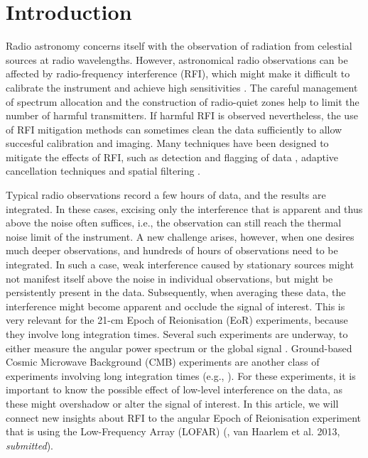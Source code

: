 \documentclass[useAMS,usenatbib]{mn2e}
\begin{document}
\section{Introduction}
Radio astronomy concerns itself with the observation of radiation from celestial sources at radio wavelengths. However, astronomical radio observations can be affected by radio-frequency interference (RFI), which might make it difficult to calibrate the instrument and achieve high sensitivities \citep{impact-of-warc79,interference-and-radioastronomy-1991,interference-model-lemmon,rfi-mitigation-overview-fridman-baan}. The careful management of spectrum allocation and the construction of radio-quiet zones help to limit the number of harmful transmitters. If harmful RFI is observed nevertheless, the use of RFI mitigation methods can sometimes clean the data sufficiently to allow succesful calibration and imaging. Many techniques have been designed to mitigate the effects of RFI, such as detection and flagging of data \citep{chi-square-time-blanking-weber, multichannel-rfi-mitigation, exoplanet-detection-with-rfi, wsrt-rfims, pulse-blanking, effelsberg-rfi-mitigation, post-correlation-rfi-classification}, adaptive cancellation techniques \citep{adaptive-cancellation,post-correlation-reference-signal} and spatial filtering \citep{multichannel-rfi-mitigation, ellingson-spatial-nulling-2002, hampson-spatial-nulling-2002, boonstra-dissertation, spatial-filtering-parkes-multibeam-for-pulses, post-correlation-filtering}. 

Typical radio observations record a few hours of data, and the results are integrated. In these cases, excising only the interference that is apparent and thus above the noise often suffices, i.e., the observation can still reach the thermal noise limit of the instrument. A new challenge arises, however, when one desires much deeper observations, and hundreds of hours of observations need to be integrated. In such a case, weak interference caused by stationary sources might not manifest itself above the noise in individual observations, but might be persistently present in the data. Subsequently, when averaging these data, the interference might become apparent and occlude the signal of interest. This is very relevant for the 21-cm Epoch of Reionisation (EoR) experiments, because they involve long integration times. Several such experiments are underway, to either measure the angular power spectrum \citep{gmrt-eor-2011-paciga,de-bruyn-eor-ursi-2011,eor-paper-2011-jacobs,eor-mwa-2012-williams} or the global signal \citep{edges}. Ground-based Cosmic Microwave Background (CMB) experiments are another class of experiments involving long integration times (e.g., \citealt{ska-cmb-subrahmanyan}). For these experiments, it is important to know the possible effect of low-level interference on the data, as these might overshadow or alter the signal of interest. In this article, we will connect new insights about RFI to the angular Epoch of Reionisation experiment that is using the Low-Frequency Array (LOFAR) (\citealt{de-bruyn-eor-ursi-2011}, van Haarlem et al. 2013, \textit{submitted}).
\end{document}
